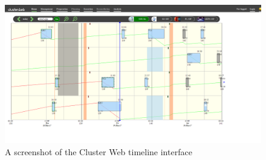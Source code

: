 \begin{figure}[ht]
  \begin{center}
    \includegraphics*[width=1\textwidth]{old_clusterweb}
  \end{center}
  \caption{A screenshot of the Cluster Web timeline interface}
  \label{fig:old_clusterweb}
\end{figure}